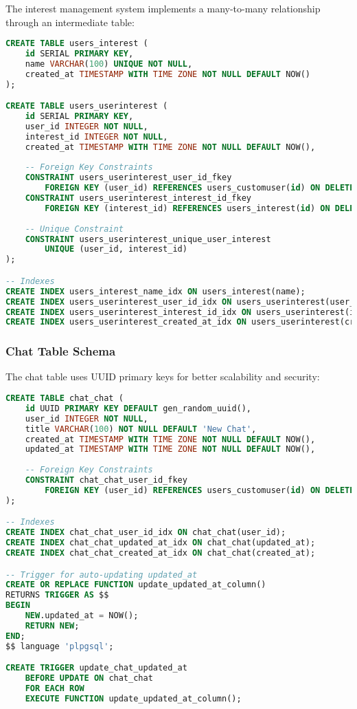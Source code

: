 \documentclass[12pt,a4paper]{article}
\begin{document}
The interest management system implements a many-to-many relationship through an intermediate table:

\begin{lstlisting}[language=SQL, caption=Interest Management Tables]
CREATE TABLE users_interest (
    id SERIAL PRIMARY KEY,
    name VARCHAR(100) UNIQUE NOT NULL,
    created_at TIMESTAMP WITH TIME ZONE NOT NULL DEFAULT NOW()
);

CREATE TABLE users_userinterest (
    id SERIAL PRIMARY KEY,
    user_id INTEGER NOT NULL,
    interest_id INTEGER NOT NULL,
    created_at TIMESTAMP WITH TIME ZONE NOT NULL DEFAULT NOW(),
    
    -- Foreign Key Constraints
    CONSTRAINT users_userinterest_user_id_fkey 
        FOREIGN KEY (user_id) REFERENCES users_customuser(id) ON DELETE CASCADE,
    CONSTRAINT users_userinterest_interest_id_fkey 
        FOREIGN KEY (interest_id) REFERENCES users_interest(id) ON DELETE CASCADE,
    
    -- Unique Constraint
    CONSTRAINT users_userinterest_unique_user_interest 
        UNIQUE (user_id, interest_id)
);

-- Indexes
CREATE INDEX users_interest_name_idx ON users_interest(name);
CREATE INDEX users_userinterest_user_id_idx ON users_userinterest(user_id);
CREATE INDEX users_userinterest_interest_id_idx ON users_userinterest(interest_id);
CREATE INDEX users_userinterest_created_at_idx ON users_userinterest(created_at DESC);
\end{lstlisting}

\subsubsection{Chat Table Schema}

The chat table uses UUID primary keys for better scalability and security:

\begin{lstlisting}[language=SQL, caption=Chat Table Structure]
CREATE TABLE chat_chat (
    id UUID PRIMARY KEY DEFAULT gen_random_uuid(),
    user_id INTEGER NOT NULL,
    title VARCHAR(100) NOT NULL DEFAULT 'New Chat',
    created_at TIMESTAMP WITH TIME ZONE NOT NULL DEFAULT NOW(),
    updated_at TIMESTAMP WITH TIME ZONE NOT NULL DEFAULT NOW(),
    
    -- Foreign Key Constraints
    CONSTRAINT chat_chat_user_id_fkey 
        FOREIGN KEY (user_id) REFERENCES users_customuser(id) ON DELETE CASCADE
);

-- Indexes
CREATE INDEX chat_chat_user_id_idx ON chat_chat(user_id);
CREATE INDEX chat_chat_updated_at_idx ON chat_chat(updated_at);
CREATE INDEX chat_chat_created_at_idx ON chat_chat(created_at);

-- Trigger for auto-updating updated_at
CREATE OR REPLACE FUNCTION update_updated_at_column()
RETURNS TRIGGER AS $$
BEGIN
    NEW.updated_at = NOW();
    RETURN NEW;
END;
$$ language 'plpgsql';

CREATE TRIGGER update_chat_updated_at 
    BEFORE UPDATE ON chat_chat 
    FOR EACH ROW 
    EXECUTE FUNCTION update_updated_at_column();
\end{lstlisting}
\end{document}
